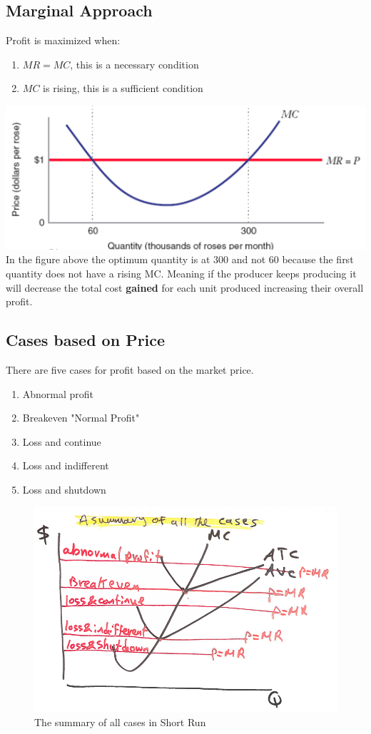 \documentclass[../ECON-281-Notes.tex]{subfiles}
\begin{document}
\subsection{Marginal Approach}
Profit is maximized when:
\begin{enumerate}
  \item $MR = MC$, this is a necessary condition
  \item $MC$ is rising, this is a sufficient condition
\end{enumerate}
\includegraphics[width=\columnwidth]{assets/image-2021-12-11-12-02-43.png}
In the figure above the optimum quantity is at 300 and not 60 because the first quantity does not have a rising MC. Meaning if the producer keeps producing it will decrease the total cost \textbf{gained} for each unit produced increasing their overall profit.


\subsection{Cases based on Price}
There are five cases for profit based on the market price.
\begin{enumerate}
  \item Abnormal profit
  \item Breakeven "Normal Profit"
  \item Loss and continue
  \item Loss and indifferent
  \item Loss and shutdown
\end{enumerate}

\begin{figure}[!h]
  \centering
  \includegraphics[width=\columnwidth]{../assets/summary_of_all_casses.png}
  \caption{The summary of all cases in Short Run}
  \label{fig:summary_of_all_cases_in_SR}
\end{figure}
\end{document}
